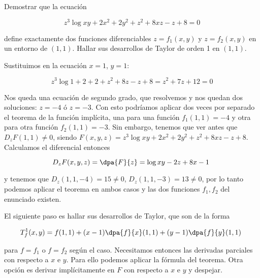 \begin{problem}[16] Demostrar que la ecuación

\[ z^3 \log xy + 2x^2 + 2y^2 +z^2 + 8xz - z  + 8 = 0 \]

define exactamente dos funciones diferenciables $z=f_1(x,y)$ y $z=f_2(x,y)$ en un entorno de $(1,1)$. Hallar sus desarrollos de Taylor de orden 1 en $(1,1)$.
\solution

Sustituimos en la ecuación $x=1$, $y=1$:

\[ z^3 \log 1 + 2+ 2 +z^2 + 8z - z  + 8 = z^2 + 7z + 12 = 0 \]

Nos queda una ecuación de segundo grado, que resolvemos y nos quedan dos soluciones: $z=-4$ ó $z=-3$. Con esto podríamos aplicar dos veces por separado el teorema de la función implícita, una para una función $f_1(1,1) = -4$ y otra para otra función $f_2(1,1) = -3$. Sin embargo, tenemos que ver antes que $D_zF(1,1) ≠ 0$, siendo $F(x,y,z) = z^3 \log xy + 2x^2 + 2y^2 +z^2 + 8xz - z  + 8$. Calculamos el diferencial entonces

\[  D_zF(x,y,z) = \dpa{F}{z} = \log xy - 2z + 8x-1 \]

y tenemos que $D_z(1,1,-4) = 15 ≠ 0$, $D_z(1,1,-3) = 13 ≠ 0$, por lo tanto podemos aplicar el teorema en ambos casos y las dos funciones $f_1, f_2$ del enunciado existen.

El siguiente paso es hallar sus desarrollos de Taylor, que son de la forma

\[ T_f^1(x,y) = f(1,1) + (x-1)\dpa{f}{x}(1,1) + (y-1) \dpa{f}{y} (1,1) \]

para $f=f_1$ o $f=f_2$ según el caso. Necesitamos entonces las derivadas parciales con respecto a $x$ e $y$. Para ello podemos aplicar la fórmula del teorema. Otra opción es derivar implícitamente en $F$ con respecto a $x$ e $y$ y despejar.
\end{problem}

